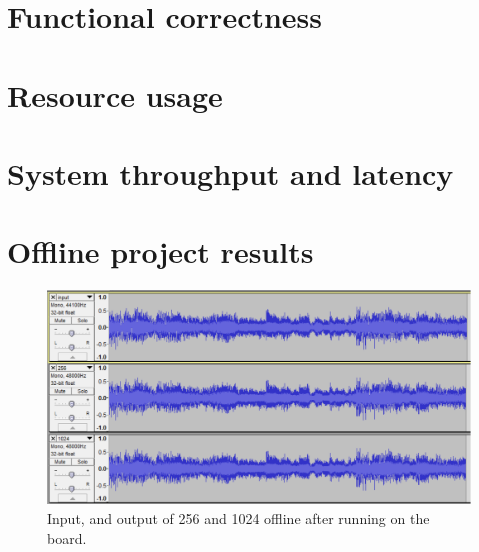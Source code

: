 \documentclass[a4paper,twoside,11pt, fleqn]{article}
\begin{document}
\section{Functional correctness}
\section{Resource usage}
\section{System throughput and latency}
\section{Offline project results}
\begin{figure}[h]
	\centering
	\includegraphics[scale = 0.6]{Images/output_offline.png}
    \caption{Input, and output of 256 and 1024 offline after running on the board.}
    \label{fig:flow}
\end{figure}
\end{document}
